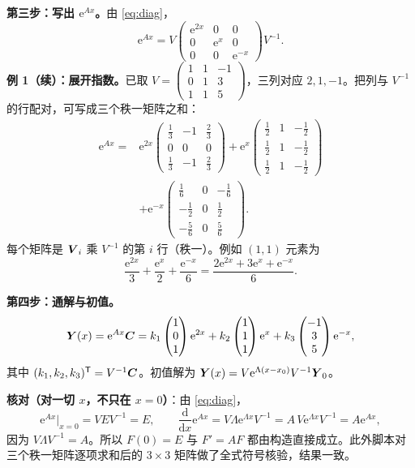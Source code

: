 \documentclass[11pt]{ctexart}
\let\basesubhdr\subhdr
\renewcommand{\subhdr}[1]{\needspace{8\baselineskip}\basesubhdr{#1}}
\let\basehdr\hdr
\renewcommand{\hdr}[2]{\needspace{11\baselineskip}\basehdr{#1}{#2}}
\newcommand{\mat}[1]{\begin{pmatrix}#1\end{pmatrix}}
\newcommand{\ee}{\mathrm{e}}
\begin{document}
\textbf{第三步：写出 $\ee^{Ax}$。}由 \eqref{eq:diag}，
\[
\ee^{Ax}=V\mat{\ee^{2x}&0&0\\0&\ee^{x}&0\\0&0&\ee^{-x}}V^{-1}.
\]
\textbf{例 1（续）：展开指数。}已取 $V=\left(\begin{smallmatrix}1&1&-1\\0&1&3\\1&1&5\end{smallmatrix}\right)$，三列对应 $2,1,-1$。把列与 $V^{-1}$ 的行配对，可写成三个秩一矩阵之和：
\begin{align*}
\ee^{Ax}={}&\ee^{2x}\mat{\frac13&-1&\frac23\\0&0&0\\\frac13&-1&\frac23}
+\ee^{x}\mat{\frac12&1&-\frac12\\[2pt]\frac12&1&-\frac12\\[2pt]\frac12&1&-\frac12}\\
&+\ee^{-x}\mat{\frac16&0&-\frac16\\[2pt]-\frac12&0&\frac12\\[2pt]-\frac56&0&\frac56}.
\end{align*}
每个矩阵是 $\boldsymbol{V}_i$ 乘 $V^{-1}$ 的第 $i$ 行（秩一）。例如 $(1,1)$ 元素为
\[
\frac{\ee^{2x}}{3}+\frac{\ee^{x}}{2}+\frac{\ee^{-x}}{6}
=\frac{2\ee^{2x}+3\ee^{x}+\ee^{-x}}{6}.
\]

\textbf{第四步：通解与初值。}
\[
\vect{Y}(x)=\ee^{Ax}\vect{C}
=k_1\mat{1\\0\\1}\ee^{2x}+k_2\mat{1\\1\\1}\ee^{x}+k_3\mat{-1\\3\\5}\ee^{-x},
\]
其中 $(k_1,k_2,k_3)^{\mathsf T}=V^{-1}\boldsymbol{C}$。初值解为 $\vect{Y}(x)=V\ee^{\Lambda(x-x_0)}V^{-1}\vect{Y}_0$。

\textbf{核对（对一切 $x$，不只在 $x=0$）}：由 \eqref{eq:diag}，
\[
\ee^{Ax}\big|_{x=0}=VEV^{-1}=E,\qquad
\frac{\mathrm{d}}{\mathrm{d}x}\ee^{Ax}=V\Lambda\ee^{\Lambda x}V^{-1}
=A\,V\ee^{\Lambda x}V^{-1}=A\ee^{Ax},
\]
因为 $V\Lambda V^{-1}=A$。所以 $F(0)=E$ 与 $F'=AF$ 都由构造直接成立。此外脚本对三个秩一矩阵逐项求和后的 $3\times3$ 矩阵做了全式符号核验，结果一致。

\label{ex:1:end}

\end{document}
